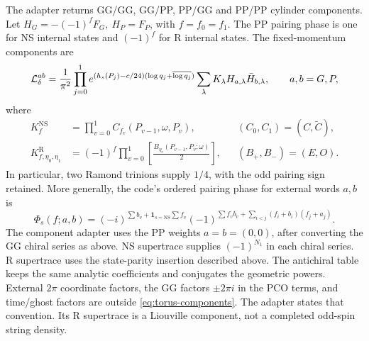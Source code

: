\documentclass[11pt]{article}
\newcommand{\NS}{\mathrm{NS}}
\newcommand{\R}{\mathrm{R}}
\newcommand{\Ct}{\widetilde C}
\begin{document}
The adapter returns GG/GG, GG/PP, PP/GG and PP/PP cylinder components.
Let \(H_G=-(-1)^fF_G,\ H_P=F_P\), with \(f=f_0=f_1\).
The PP pairing phase is one for NS internal states and \((-1)^f\)
for R internal states. The fixed-momentum
components are
\begin{equation}
 {\cal L}^{ab}_\delta=
 \frac1{\pi^2}\prod_{j=0}^1
 e^{(h_s(P_j)-c/24)(\log q_j+\overline{\log q_j})}
 \sum_{\lambda}K_\lambda H_{a,\lambda}\bar H_{b,\lambda},
 \qquad a,b=G,P,
 \label{eq:torus-components}
\end{equation}
where
\begin{align}
 K_f^\NS&=\prod_{v=0}^1C_{f_v}(P_{v-1},\omega,P_v),
                    &&(C_0,C_1)=(C,\Ct),\\
 K_{f,\eta_0,\eta_1}^{\R}
 &=(-1)^f\prod_{v=0}^1\left[\frac{B_{\eta_v}(P_{v-1},P_v;\omega)}2\right],
                    &&(B_+,B_-)=(E,O).
\end{align}
In particular, two Ramond trinions supply \(1/4\), with the odd
pairing sign retained. More generally, the code's ordered pairing
phase for external words \(a,b\) is
\[
 \Phi_s(f;a,b)=(-i)^{\sum b_v+\mathbf1_{s=\NS}\sum f_v}
 (-1)^{\sum f_vb_v+\sum_{i<j}(f_i+b_i)(f_j+a_j)}.
\]
The component adapter uses the PP weights \(a=b=(0,0)\), after
converting the GG chiral series as above.
NS supertrace supplies \((-1)^{N_1}\) in each chiral series.
R supertrace uses the state-parity insertion described above.
The antichiral table keeps the same analytic coefficients and
conjugates the geometric powers.
External \(2\pi\) coordinate factors, the GG factors \(\pm2\pi i\)
in the PCO terms, and time/ghost factors are outside
\eqref{eq:torus-components}. The adapter states that convention.
Its R supertrace is a Liouville component, not a completed odd-spin
string density.
\end{document}
